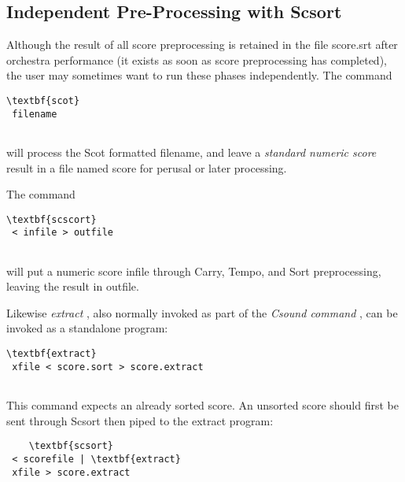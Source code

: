  
\subsection*{Independent Pre-Processing with Scsort}


  Although the result of all score preprocessing is retained in the file score.srt after orchestra performance (it exists as soon as score preprocessing has completed), the user may sometimes want to run these phases independently. The command 


 
\begin{lstlisting}
\textbf{scot}
 filename
        
\end{lstlisting}


 


  will process the Scot formatted filename, and leave a \emph{standard numeric score}
 result in a file named score for perusal or later processing. 


  The command 


 
\begin{lstlisting}
\textbf{scscort}
 < infile > outfile
        
\end{lstlisting}


 


  will put a numeric score infile through Carry, Tempo, and Sort preprocessing, leaving the result in outfile. 


  Likewise \emph{extract}
, also normally invoked as part of the \emph{Csound command}
, can be invoked as a standalone program: 


 
\begin{lstlisting}
\textbf{extract}
 xfile < score.sort > score.extract
        
\end{lstlisting}


 


  This command expects an already sorted score. An unsorted score should first be sent through Scsort then piped to the extract program: 


 
\begin{lstlisting}
    \textbf{scsort}
 < scorefile | \textbf{extract}
 xfile > score.extract
        
\end{lstlisting}


 


\begin{comment}
\begin{tabular}{lcr}
Previous &Home &Next \\
Unified File Format for Orchestras and Scores &Up &Syntax of the Orchestra

\end{tabular}



\end{comment}
